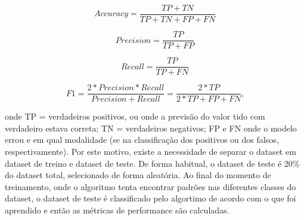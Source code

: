 \begin{equation}
      Accuracy = \frac{TP+TN}{TP+TN+FP+FN}
\end{equation}

\begin{equation}
      Precision = \frac{TP}{TP+FP}
\end{equation}

\begin{equation}
      Recall = \frac{TP}{TP+FN}
\end{equation}

\begin{equation}
      F1 = \frac{2*Precision*Recall}{Precision+Recall} = \frac{2*TP}{2*TP+FP+FN}\text{,}
\end{equation}

onde TP = verdadeiros positivos, ou onde a previsão do valor tido com verdadeiro estava correta; TN = verdadeiros negativos;
FP e FN onde o modelo errou e em qual modalidade (se na classificação dos positivos ou dos falsos, respectivamente).
Por este motivo, existe a necessidade de separar o dataset em dataset de treino e dataset de teste. De forma habitual, o dataset
de teste é 20\% do dataset total, selecionado de forma aleatória. Ao final do momento de treinamento, onde o algoritmo 
tenta encontrar padrões nas diferentes classes do dataset, o dataset de teste é classificado pelo algortimo de acordo 
com o que foi aprendido e então as métricas de performance são calculadas.


